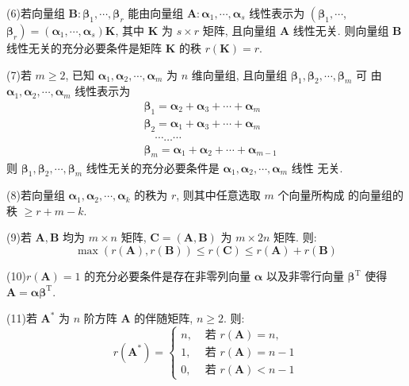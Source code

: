 \documentclass{article}
\begin{document}
(6)若向量组 $\boldsymbol{B}: \boldsymbol{\beta}_{1}, \cdots, \boldsymbol{\beta}_{r}$ 能由向量组 $\boldsymbol{A}: \boldsymbol{\alpha}_{1}, \cdots, \boldsymbol{\alpha}_{s}$ 线性表示为 $\left(\boldsymbol{\beta}_{1}, \cdots\right.$, $\left.\boldsymbol{\beta}_{r}\right)=\left(\boldsymbol{\alpha}_{1}, \cdots, \boldsymbol{\alpha}_{s}\right) \boldsymbol{K}$, 其中 $\boldsymbol{K}$ 为 $s \times r$ 矩阵, 且向量组 $\boldsymbol{A}$ 线性无关. 则向量组 $\boldsymbol{B}$ 线性无关的充分必要条件是矩阵 $\boldsymbol{K}$ 的秩 $r(\boldsymbol{K})=r$.

(7)若 $m \geq 2$, 已知 $\boldsymbol{\alpha}_{1}, \boldsymbol{\alpha}_{2}, \cdots, \boldsymbol{\alpha}_{m}$ 为 $n$ 维向量组, 且向量组 $\boldsymbol{\beta}_{1}, \boldsymbol{\beta}_{2}, \cdots, \boldsymbol{\beta}_{m}$ 可 由 $\boldsymbol{\alpha}_{1}, \boldsymbol{\alpha}_{2}, \cdots, \boldsymbol{\alpha}_{m}$ 线性表示为
$$
\begin{aligned}
	&\boldsymbol{\beta}_{1}=\boldsymbol{\alpha}_{2}+\boldsymbol{\alpha}_{3}+\cdots+\boldsymbol{\alpha}_{m} \\
	&\boldsymbol{\beta}_{2}=\boldsymbol{\alpha}_{1}+\boldsymbol{\alpha}_{3}+\cdots+\boldsymbol{\alpha}_{m} \\
	&\quad \cdots \ldots \cdots \\
	&\boldsymbol{\beta}_{m}=\boldsymbol{\alpha}_{1}+\boldsymbol{\alpha}_{2}+\cdots+\boldsymbol{\alpha}_{m-1}
\end{aligned}
$$
则 $\boldsymbol{\beta}_{1}, \boldsymbol{\beta}_{2}, \cdots, \boldsymbol{\beta}_{m}$ 线性无关的充分必要条件是 $\boldsymbol{\alpha}_{1}, \boldsymbol{\alpha}_{2}, \cdots, \boldsymbol{\alpha}_{m}$ 线性 无关.

(8)若向量组 $\boldsymbol{\alpha}_{1}, \boldsymbol{\alpha}_{2}, \cdots, \boldsymbol{\alpha}_{k}$ 的秩为 $r$, 则其中任意选取 $m$ 个向量所构成 的向量组的秩 $\geq r+m-k$.

(9)若 $\boldsymbol{A}, \boldsymbol{B}$ 均为 $m \times n$ 矩阵, $\boldsymbol{C}=(\boldsymbol{A}, \boldsymbol{B})$ 为 $m \times 2 n$ 矩阵. 则:
$$
\max (r(\boldsymbol{A}), r(\boldsymbol{B})) \leq r(\boldsymbol{C}) \leq r(\boldsymbol{A})+r(\boldsymbol{B})
$$

(10)$r(\boldsymbol{A})=1$ 的充分必要条件是存在非零列向量 $\boldsymbol{\alpha}$ 以及非零行向量 $\boldsymbol{\beta}^{\mathrm{T}}$ 使得 $\boldsymbol{A}=\boldsymbol{\alpha} \boldsymbol{\beta}^{\mathrm{T}}$.

(11)若 $\boldsymbol{A}^{*}$ 为 $n$ 阶方阵 $\boldsymbol{A}$ 的伴随矩阵, $n \geq 2$. 则:
$$
r\left(\boldsymbol{A}^{*}\right)= \begin{cases}n, & \text { 若 } r(\boldsymbol{A})=n, \\ 1, & \text { 若 } r(\boldsymbol{A})=n-1 \\ 0, & \text { 若 } r(\boldsymbol{A})<n-1\end{cases}
$$
\end{document}
